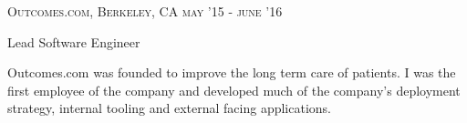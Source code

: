 
\textsc{\small{Outcomes.com, Berkeley, CA}}
\hfill	
\textsc{\raggedleft may '15 - june '16}
  
{\Large Lead Software Engineer}

Outcomes.com was founded to improve the long term care of patients. I was the first employee of the company and developed much of the company's deployment strategy, internal tooling and external facing applications. 
